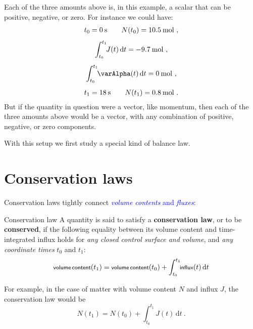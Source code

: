 \documentclass[a4paper,12pt,%
onecolumn,oneside,%
british%
]{memoir}
\renewcommand*{\bm}[1]{\textpdfrender{TextRenderingMode=2,LineWidth=0.2pt}{\boldsymbol{#1}}}
\newcommand*{\di}{\mathrm{d}}%
\renewcommand*{\|}[1][]{\nonscript\:#1\vert\nonscript\:\mathopen{}}
\newcommand*{\sect}{\S}%
\renewcommand*{\autoref}[2]{\sidepar{\vspace{-1ex}\footnotesize{\color{blue}\faIcon{%
angle-right%
}\enskip\sect~\ref{#1} page~\pageref{#1}}}\textcolor{blue}{#2}}
\newcommand*{\yti}{t_{0}}
\newcommand*{\ytf}{t_{1}}
\newcommand*{\yN}{N}
\newcommand*{\yJ}{J}
\newcommand*{\ya}{\varAlpha}
\begin{document}
Each of the three amounts above is, in this example, a scalar that can be positive, negative, or zero. For instance we could have:
\begin{equation*}
  \begin{gathered}
    \yti = \qty{0}{s} \qquad \yN(\yti) = \qty{10.5}{mol}\ ,
    \\[1ex]
    \int_{\yti}^{\ytf}\!\!\yJ(t)\, \di t = \qty{-9.7}{mol} \ ,
    \\[1ex]
    \int_{\yti}^{\ytf}\!\!\ya(t)\, \di t = \qty{0}{mol} \ ,
    \\[1ex]
    \ytf = \qty{18}{s} \qquad \yN(\ytf) = \qty{0.8}{mol} \ .
  \end{gathered}
\end{equation*}
But if the quantity in question were a vector, like momentum, then each of the three amounts above would be a vector, with any combination of positive, negative, or zero components.


\medskip

With this setup we first study a special kind of balance law.

\section{Conservation laws}
\label{sec:conservation_laws}

Conservation laws tightly connect \autoref{cha:contents_fluxes}{\emph{volume contents} and \emph{fluxes}}:

\begin{definition}{Conservation law}
  A quantity is said to satisfy a \textbf{conservation law}, or to be \textbf{conserved}, if the following equality between its volume content and time-integrated influx holds for \emph{any closed control surface and volume}, and \emph{any coordinate times} $\yti$ and $\ytf$:
  \begin{equation}
    \label{eq:conserved}
    \textsf{\footnotesize volume\,content}(\ytf) =
    \textsf{\footnotesize volume\,content}(\yti) +
    \int_{\yti}^{\ytf}\!\!\textsf{\footnotesize influx}(t)\,\di t
  \end{equation}
\end{definition}
For example, in the case of matter with volume content $\yN$ and influx $\yJ$, the conservation law would be
\begin{equation*}
  \yN(\ytf) = \yN(\yti) + \int_{\yti}^{\ytf}\!\!\yJ(t)\, \di t \ .
\end{equation*}
\end{document}
